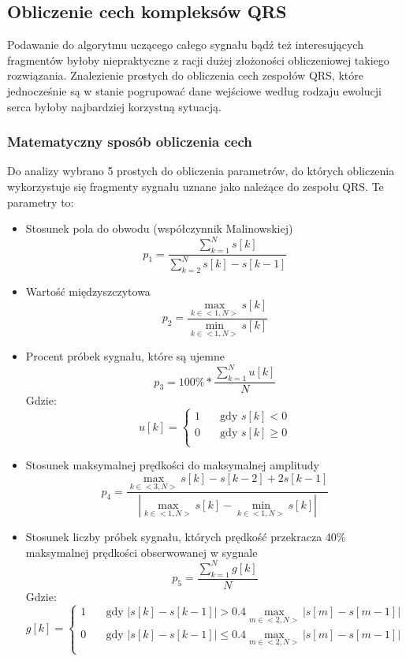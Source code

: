 \documentclass[[10pt,a4paper]{article}
\begin{document}
\subsection{Obliczenie cech kompleksów QRS}

Podawanie do algorytmu uczącego całego sygnału bądź też interesujących fragmentów byłoby niepraktyczne z racji dużej złożoności obliczeniowej takiego rozwiązania. Znalezienie prostych do obliczenia cech zespołów QRS, które jednocześnie są w stanie pogrupować dane wejściowe według rodzaju ewolucji serca byłoby najbardziej korzystną sytuacją. \cite{august}

\subsubsection{Matematyczny sposób obliczenia cech}
Do analizy wybrano 5 prostych do obliczenia parametrów, do których obliczenia wykorzystuje się fragmenty sygnału uznane jako należące do zespołu QRS. \cite{p15}
Te parametry to:

\begin{itemize}
	\item{Stosunek pola do obwodu (współczynnik Malinowskiej)
	\begin{equation}
	p_1 = \frac{\sum_{k=1}^{N} s[k]}{\sum_{k=2}^{N} s[k]-s[k-1]}
	\end{equation}	}
	\item{Wartość międzyszczytowa
	\begin{equation}
	p_2 = \frac{\max_{k \in <1,N>} s[k]}{\min_{k \in <1,N>} s[k]}
	\end{equation}}
	\item{Procent próbek sygnału, które są ujemne
	\begin{equation}
	p_3 = 100\% * \frac{\sum_{k=1}^{N} u[k]}{N}
	\end{equation} }
	Gdzie:
	\[ u[k] =
	\begin{cases}
	1       & \quad \text{gdy } s[k] < 0\\
	0	    & \quad \text{gdy } s[k] \geq 0\\
	\end{cases}
	\]
	\item{Stosunek maksymalnej prędkości do maksymalnej amplitudy
	\begin{equation}
	p_4 = \frac{\max_{k \in <3,N>} s[k]-s[k-2]+2s[k-1]}{|\max_{k \in <1,N>} s[k] - \min_{k \in <1,N>} s[k]|}
	\end{equation}}
	\item{Stosunek liczby próbek sygnału, których prędkość przekracza 40\% maksymalnej prędkości obserwowanej w sygnale
	\begin{equation}
	p_5 = \frac{\sum_{k=1}^{N} g[k]}{N}
	\end{equation}}
	Gdzie:
	\[ g[k] =
	\begin{cases}
	1       & \quad \text{gdy } |s[k]-s[k-1]| > 0.4 \max_{m \in <2,N>} |s[m]-s[m-1]|\\
	0	    & \quad \text{gdy } |s[k]-s[k-1]| \leq 0.4 \max_{m \in <2,N>} |s[m]-s[m-1]|\\
	\end{cases}
	\]
\end{itemize}
\end{document}
